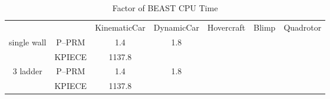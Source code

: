 \documentclass{article}
\begin{document}
\begin{table}[]
\centering
  \caption{Factor of BEAST CPU Time}
\begin{tabular}{c c c c c c c}
&&KinematicCar&DynamicCar&Hovercraft&Blimp&Quadrotor\\
\multirow{2}{*}{single wall}&P--PRM&1.4&1.8&&&\\
&KPIECE&1137.8&&&&\\
\multirow{2}{*}{3 ladder}&P--PRM&1.4&1.8&&&\\
&KPIECE&1137.8&&&&\\
\end{tabular}
\end{table}
\end{document}
